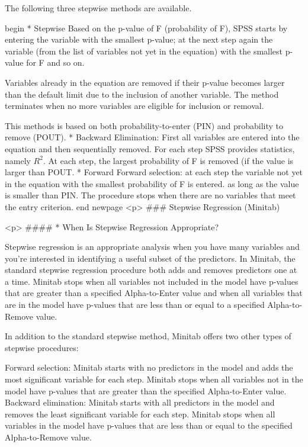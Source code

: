 The following three stepwise methods are available.

begin{ }
         * Stepwise Based on the p-value of F (probability of F), SPSS starts by entering the variable with the smallest p-value; at the next step again the variable (from the list of variables not yet in the equation) with the smallest p-value for F and so on. 
    
    Variables already in the equation are removed if their p-value becomes larger than the default limit due to the inclusion of another variable. The method terminates when no more variables are eligible for inclusion or removal.	
    
    This methods is based on both probability-to-enter (PIN) and probability to remove (POUT).
         * Backward Elimination: First all variables are entered into the equation and then sequentially removed. For each step SPSS provides statistics, namely $R^2$. At each step, the largest probability of F is removed (if the value is larger than POUT.
         * Forward Forward selection: at each step the variable not yet in the equation with the smallest probability of F is entered. as long as the value is smaller than PIN. The procedure stops when there are no variables that meet the entry criterion.
end{ }
newpage
<p>
### {Stepwise Regression (Minitab)}

<p>
####        * {When Is Stepwise Regression Appropriate?}

Stepwise regression is an appropriate analysis when you have many variables and you’re interested in identifying a useful subset of the predictors. In Minitab, the standard stepwise regression procedure both adds and removes predictors one at a time. Minitab stops when all variables not included in the model have p-values that are greater than a specified Alpha-to-Enter value and when all variables that are in the model have p-values that are less than or equal to a specified Alpha-to-Remove value.

In addition to the standard stepwise method, Minitab offers two other types of stepwise procedures:

Forward selection:  Minitab starts with no predictors in the model and adds the most significant variable for each step. Minitab stops when all variables not in the model have p-values that are greater than the specified Alpha-to-Enter value.
Backward elimination:  Minitab starts with all predictors in the model and removes the least significant variable for each step. Minitab stops when all variables in the model have p-values that are less than or equal to the specified Alpha-to-Remove value.


